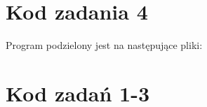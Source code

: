 \documentclass[varwidth,12pt,a4paper]{article}
\begin{document}
\section{Kod zadania 4}
Program podzielony jest na następujące pliki:





\section{Kod zadań 1-3}

\end{document}
